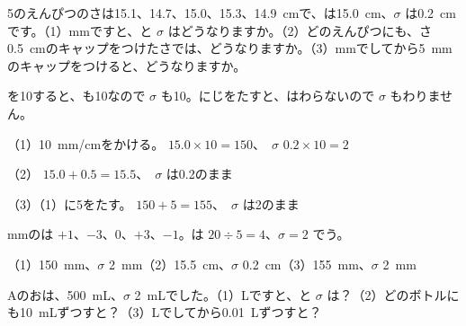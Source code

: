 \begin{reidai}
5のえんぴつのさは15.1、14.7、15.0、15.3、\qty{14.9}{cm}で、は\qty{15.0}{cm}、$\sigma$ は\qty{0.2}{cm}です。（1）mmですと、と $\sigma$ はどうなりますか。（2）どのえんぴつにも、さ\qty{0.5}{cm}のキャップをつけたさでは、どうなりますか。（3）mmでしてから\qty{5}{mm}のキャップをつけると、どうなりますか。\par
\kangaekata {}を10すると、も10なので $\sigma$ も10。にじをたすと、はわらないので $\sigma$ もわりません。\par
\shiki（1）\qty{10}{mm/cm}をかける。 $15.0\times10=150$、\ $\sigma$ $0.2\times10=2$\par
\hspace*{2.6\zw}（2） $15.0+0.5=15.5$、\ $\sigma$ は0.2のまま\par
\hspace*{2.6\zw}（3）（1）に5をたす。 $150+5=155$、\ $\sigma$ は2のまま\par
{}mmのは $+1$、$-3$、0、$+3$、$-1$。は $20\div5=4$、$\sigma=2$ でう。\par
\kotae（1）\qty{150}{mm}、$\sigma$ \qty{2}{mm}（2）\qty{15.5}{cm}、$\sigma$ \qty{0.2}{cm}（3）\qty{155}{mm}、$\sigma$ \qty{2}{mm}
\end{reidai}

\begin{jibun}
Aのおは、\qty{500}{mL}、$\sigma$ \qty{2}{mL}でした。（1）Lですと、と $\sigma$ は？（2）どのボトルにも\qty{10}{mL}ずつすと？（3）Lでしてから\qty{0.01}{L}ずつすと？
\end{jibun}

